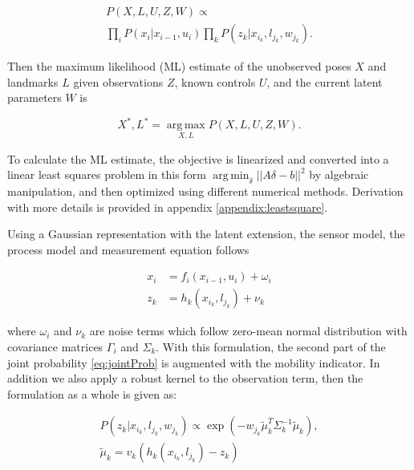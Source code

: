 \begin{multline}
P(X, L, U, Z, W) \propto  \\
\prod\limits_{i}P(x_i|x_{i-1}, u_i)\prod\limits_{k}P(z_k|x_{i_k}, l_{j_k}, w_{j_k}).
\label{eq:jointProb}
\end{multline}

Then the maximum likelihood (ML) estimate of the unobserved poses $X$ and landmarks $L$ given observations $Z$, known controls $U$, and the current latent parameters $W$ is

\begin{equation}
X^*, L^* = \operatorname*{arg\,max}_{X,L} P(X,L,U,Z,W).
\end{equation}

To calculate the ML estimate, the objective is linearized and converted into a linear least
squares problem in this form $\operatorname*{arg\,min}_{\delta} || A
\delta  - b ||^2$ by algebraic manipulation, and then optimized using
different numerical methods. Derivation with more details is provided in appendix \ref{appendix:leastsquare}.

Using a Gaussian representation with the latent extension, the sensor
model, the process model and measurement equation follows

\begin{equation}
\begin{aligned}
x_i &= f_i(x_{i-1}, u_i) + \omega_i \\
z_k &= h_k(x_{i_k}, l_{j_k}) + \nu_k
\end{aligned}
\label{eq:gaussRepresentation}
\end{equation}

where $\omega_i$ and $\nu_k$ are noise terms which follow zero-mean normal distribution with covariance matrices $\Gamma_i$ and $\Sigma_k$. With this formulation, the second part of the joint probability \ref{eq:jointProb} is augmented with the mobility indicator. In addition we also apply a robust kernel to the observation term, then the formulation as a whole is given as:

\begin{equation}
\begin{aligned}
P(z_k|x_{i_k}, l_{j_k}, w_{j_k})\propto \exp(-w_{j_k} \tilde{\mu}_k^T \Sigma_k^{-1} \tilde{\mu}_k),\\
 \tilde{\mu}_k = v_k(h_k(x_{i_k}, l_{j_k}) - z_k)
\label{eq:sensor}
\end{aligned}
\end{equation}

